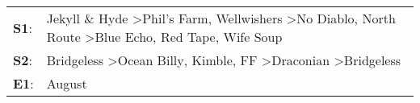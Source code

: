 \begin{supertabular}{p{0.03\textwidth}p{0.92\textwidth}}
 \textbf{S1}:  &  Jekyll \& Hyde\textsuperscript{} \textgreater \enspace Phil's Farm\textsuperscript{}, \enspace Wellwishers\textsuperscript{} \textgreater \enspace No Diablo\textsuperscript{}, \enspace North Route\textsuperscript{} \textgreater \enspace Blue Echo\textsuperscript{}, \enspace Red Tape\textsuperscript{}, \enspace Wife Soup\textsuperscript{}  \enspace  \\
 \textbf{S2}:  &                                                                                              Bridgeless\textsuperscript{} \textgreater \enspace Ocean Billy\textsuperscript{}, \enspace Kimble\textsuperscript{}, \enspace FF\textsuperscript{} \textgreater \enspace Draconian\textsuperscript{} \textgreater \enspace Bridgeless\textsuperscript{}  \enspace  \\
 \textbf{E1}:  &                                                                                                                                                                                                                                                                                                                             August\textsuperscript{}  \enspace  \\
\end{supertabular}
